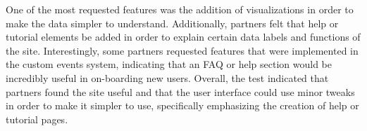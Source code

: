 One of the most requested features was the addition of visualizations in order to make the data simpler to understand. Additionally, partners felt that help or tutorial elements be added in order to explain certain data labels and functions of the site. Interestingly, some partners requested features that were implemented in the custom events system, indicating that an FAQ or help section would be incredibly useful in on-boarding new users. Overall, the test indicated that partners found the site useful and that the user interface could use minor tweaks in order to make it simpler to use, specifically emphasizing the creation of help or tutorial pages.










